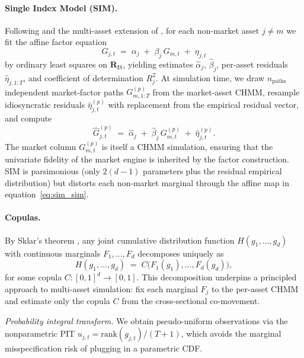 \paragraph{Single Index Model (SIM).}
Following \citet{sharpe1963simplified} and the multi-asset extension of \citet{alswaidan2026hybrid}, for each non-market asset $j \neq m$ we fit the affine factor equation
\begin{equation}
    G_{j,t} \;=\; \alpha_j \;+\; \beta_j\, G_{m,t} \;+\; \eta_{j,t}
    \label{eq:sim}
\end{equation}
by ordinary least squares on $\mathbf{R}_{\text{IS}}$, yielding estimates $\hat{\alpha}_j$, $\hat{\beta}_j$, per-asset residuals $\hat{\eta}_{j,1:T}$, and coefficient of determination $R^2_j$.
At simulation time, we draw $n_{\text{paths}}$ independent market-factor paths $G_{m,1:T}^{(p)}$ from the market-asset CHMM, resample idiosyncratic residuals $\hat{\eta}_{j,t}^{(p)}$ with replacement from the empirical residual vector, and compute
\begin{equation}
    \hat{G}_{j,t}^{(p)} \;=\; \hat{\alpha}_j \;+\; \hat{\beta}_j\, G_{m,t}^{(p)} \;+\; \hat{\eta}_{j,t}^{(p)}.
    \label{eq:sim_sim}
\end{equation}
The market column $G_{m,t}^{(p)}$ is itself a CHMM simulation, ensuring that the univariate fidelity of the market engine is inherited by the factor construction.
SIM is parsimonious (only $2(d-1)$ parameters plus the residual empirical distribution) but distorts each non-market marginal through the affine map in equation~\eqref{eq:sim_sim}.

\paragraph{Copulas.}
By Sklar's theorem \cite{sklar1959fonctions}, any joint cumulative distribution function $H(g_1, \dots, g_d)$ with continuous marginals $F_1, \dots, F_d$ decomposes uniquely as
\begin{equation}
    H(g_1, \dots, g_d) \;=\; C\bigl(F_1(g_1), \dots, F_d(g_d)\bigr),
    \label{eq:sklar}
\end{equation}
for some copula $C : [0,1]^d \to [0,1]$.
This decomposition underpins a principled approach to multi-asset simulation: fix each marginal $F_j$ to the per-asset CHMM and estimate only the copula $C$ from the cross-sectional co-movement.

\textit{Probability integral transform.}
We obtain pseudo-uniform observations via the nonparametric PIT $u_{j,t} = \text{rank}(g_{j,t}) / (T+1)$, which avoids the marginal misspecification risk of plugging in a parametric CDF.

